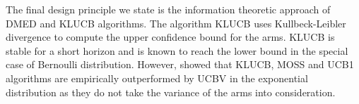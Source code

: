 	The final design principle we state is the information theoretic approach of  DMED \citep{honda2010asymptotically} and KLUCB \citep{garivier2011kl} algorithms. The algorithm KLUCB uses Kullbeck-Leibler divergence to compute the upper confidence bound for the arms. KLUCB is stable for a short horizon and is known to reach the \citet{lai1985asymptotically} lower bound in the special case of Bernoulli distribution. However, \citet{garivier2011kl} showed that KLUCB, MOSS and UCB1 algorithms are  empirically outperformed by UCBV in the exponential distribution as they do not take the variance of the arms into consideration. 